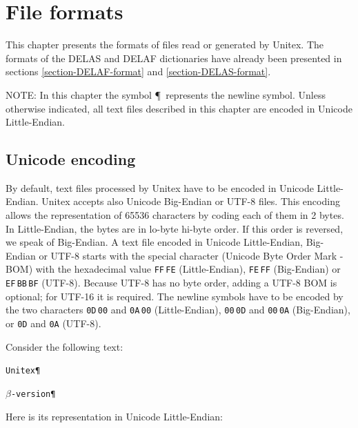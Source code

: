 \chapter{File formats}
\label{chap-file-formats}
This chapter presents the formats of files read or generated by Unitex. The
formats of the DELAS and DELAF dictionaries have already been presented in
sections \ref{section-DELAF-format} and \ref{section-DELAS-format}.

\bigskip
\noindent NOTE: In this chapter the symbol \P ~represents the newline symbol.
Unless otherwise indicated, all text files described in this chapter are encoded
in Unicode Little-Endian.

\section{Unicode encoding}
\label{unicode-encoding}
By default, text files processed by Unitex have to be encoded in Unicode Little-Endian.
Unitex accepts also Unicode Big-Endian or UTF-8 files.
This encoding allows the representation of 65536 characters by coding each of
them in 2 bytes. In Little-Endian, the bytes are in lo-byte hi-byte order. If
this order is reversed, we speak of Big-Endian. A text file encoded in Unicode
Little-Endian, Big-Endian or UTF-8 starts with the special character (Unicode Byte Order Mark - BOM) with the hexadecimal value
\verb+FF+\,\verb+FE+ (Little-Endian), \verb+FE+\,\verb+FF+ (Big-Endian) or \verb+EF+\,\verb+BB+\,\verb+BF+ (UTF-8). 
Because UTF-8 has no byte order, adding a UTF-8 BOM is optional; for UTF-16 it is required.
The newline symbols have to be encoded by the two characters \verb+0D+\,\verb+00+ and \verb+0A+\,\verb+00+ (Little-Endian), 
\verb+00+\,\verb+0D+ and \verb+00+\,\verb+0A+ (Big-Endian), or \verb+0D+ and \verb+0A+ (UTF-8).

\bigskip
\noindent Consider the following text:

\bigskip
\texttt{Unitex\P}

\texttt{$\beta$-version\P}

\bigskip
\noindent Here is its representation in Unicode Little-Endian:

